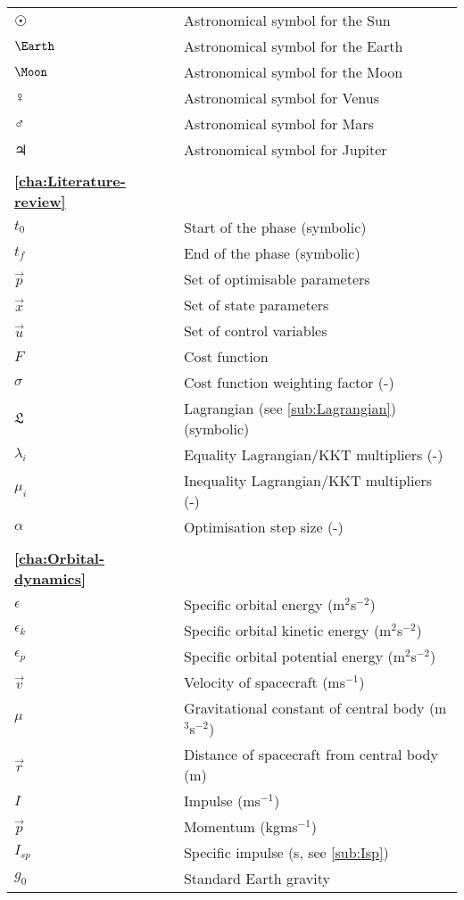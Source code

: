 \begin{longtable}{l p{}}
$\Sun$ & Astronomical symbol for the Sun \\
$\Earth$ & Astronomical symbol for the Earth \\
$\Moon$ & Astronomical symbol for the Moon \\
$\Venus$ & Astronomical symbol for Venus \\
$\Mars$ & Astronomical symbol for Mars \\
$\Jupiter$ & Astronomical symbol for Jupiter \\
\\
\textbf{\autoref{cha:Literature-review}} \\
$t_0$ & Start of the phase (symbolic) \\
$t_f$ & End of the phase (symbolic) \\
$\vec{p}$ & Set of optimisable parameters \\
$\vec{x}$ & Set of state parameters \\
$\vec{u}$ & Set of control variables \\
$F$ & Cost function \\
$\sigma$ & Cost function weighting factor (-) \\
$\mathfrak{L}$ & Lagrangian (see \autoref{sub:Lagrangian}) (symbolic) \\
$\lambda_i$ & Equality Lagrangian/KKT multipliers (-) \\
$\mu_i$ & Inequality Lagrangian/KKT multipliers (-) \\
$\alpha$ & Optimisation step size (-) \\
\\
\textbf{\autoref{cha:Orbital-dynamics}} \\
$\epsilon$ & Specific orbital energy (m$^2$s$^{-2}$) \\
$\epsilon_k$ & Specific orbital kinetic energy (m$^2$s$^{-2}$) \\
$\epsilon_p$ & Specific orbital potential energy (m$^2$s$^{-2}$) \\
$\vec{v}$ & Velocity of spacecraft (ms$^{-1}$) \\
$\mu$ & Gravitational constant of central body (m$^3$s$^{-2}$) \\
$\vec{r}$ & Distance of spacecraft from central body (m) \\
$I$ & Impulse (ms$^{-1}$) \\
$\vec{p}$ & Momentum (kgms$^{-1}$) \\
$I_{sp}$ & Specific impulse (s, see \autoref{sub:Isp}) \\
$g_0$ & Standard Earth gravity \parencite[9.80665~ms$^{-2}$,][]{CGPM} \\

\end{longtable}
